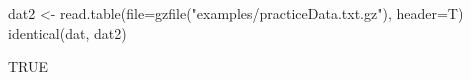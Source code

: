 \begin{Schunk}
\begin{Sinput}
  dat2 <- read.table(file=gzfile("examples/practiceData.txt.gz"), header=T)
  identical(dat, dat2)
\end{Sinput}
\begin{Soutput}
[1] TRUE
\end{Soutput}
\end{Schunk}
